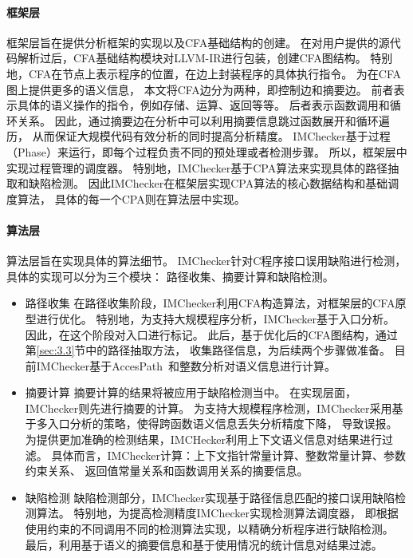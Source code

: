 \paragraph{框架层}
框架层旨在提供分析框架的实现以及CFA基础结构的创建。
在对用户提供的源代码解析过后，CFA基础结构模块对LLVM-IR进行包装，创建CFA图结构。
特别地，CFA在节点上表示程序的位置，在边上封装程序的具体执行指令。
为在CFA图上提供更多的语义信息，
本文将CFA边分为两种，即控制边和摘要边。
前者表示具体的语义操作的指令，例如存储、运算、返回等等。
后者表示函数调用和循环关系。
因此，通过摘要边在分析中可以利用摘要信息跳过函数展开和循环遍历，
从而保证大规模代码有效分析的同时提高分析精度。
IMChecker基于过程（Phase）来运行，即每个过程负责不同的预处理或者检测步骤。
所以，框架层中实现过程管理的调度器。
特别地，IMChecker基于CPA算法来实现具体的路径抽取和缺陷检测。
因此IMChecker在框架层实现CPA算法的核心数据结构和基础调度算法，
具体的每一个CPA则在算法层中实现。

\paragraph{算法层}
算法层旨在实现具体的算法细节。
IMChecker针对C程序接口误用缺陷进行检测，具体的实现可以分为三个模块：
路径收集、摘要计算和缺陷检测。
\begin{itemize}
	\item {\kaishu 路径收集} 
	在路径收集阶段，IMChecker利用CFA构造算法，对框架层的CFA原型进行优化。
	特别地，为支持大规模程序分析，IMChecker基于入口分析。
	因此，在这个阶段对入口进行标记。
	此后，基于优化后的CFA图结构，通过第\ref{sec:3.3}节中的路径抽取方法，
	收集路径信息，为后续两个步骤做准备。
	目前IMChecker基于AccesPath~\cite{15-ase-accesspath}和整数分析对语义信息进行计算。
	\item {\kaishu 摘要计算} 
	摘要计算的结果将被应用于缺陷检测当中。
	在实现层面，IMChecker则先进行摘要的计算。
	为支持大规模程序检测，IMChecker采用基于多入口分析的策略，使得跨函数语义信息丢失分析精度下降，
	导致误报。
	为提供更加准确的检测结果，IMCHecker利用上下文语义信息对结果进行过滤。
	具体而言，IMChecker计算：上下文指针常量计算、整数常量计算、参数约束关系、
	返回值常量关系和函数调用关系的摘要信息。
	\item {\kaishu 缺陷检测} 
	缺陷检测部分，IMChecker实现基于路径信息匹配的接口误用缺陷检测算法。
	特别地，为提高检测精度IMChecker实现检测算法调度器，
	即根据使用约束的不同调用不同的检测算法实现，以精确分析程序进行缺陷检测。
	最后，利用基于语义的摘要信息和基于使用情况的统计信息对结果过滤。
\end{itemize}


